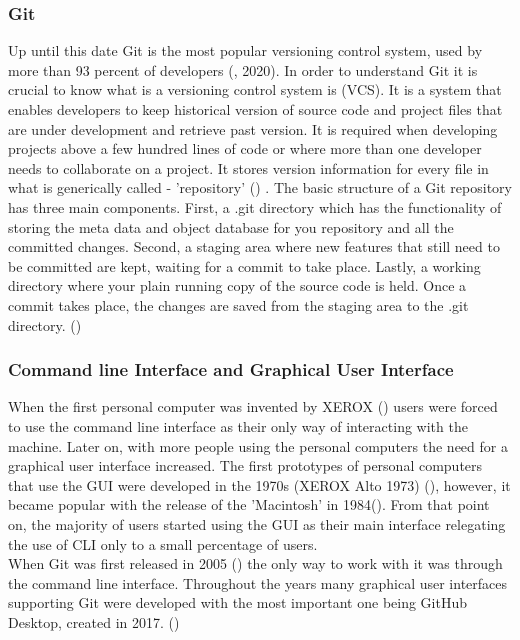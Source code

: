 \documentclass[]{report}
\begin{document}
	\subsubsection{Git}
	Up until this date Git is the most popular versioning control system, used by more than 93 percent of developers (\cite{stackoverflow_stack_nodate}, 2020). In order to understand Git it is crucial to know what is a versioning control system is (VCS). It is a system that enables developers to keep historical version of source code and project files that are under development and retrieve past version. It is required when developing projects above a few hundred lines of code or where more than one developer needs to collaborate on a project. It stores version information for every file in what is generically called - 'repository' (\cite{ruparelia_history_2010}) . The basic structure of a Git repository has three main components. First, a .git directory which has the functionality of storing the meta data and object database for you repository and all the committed changes. Second, a staging area where new features that still need to be committed are kept, waiting for a commit to take place. Lastly, a working directory where your plain running copy of the source code is held. Once a commit takes place, the changes are saved from the staging area to the .git directory. (\cite{hultstrand_git_2015})
	
	\subsubsection{Command line Interface and Graphical User Interface}
	
	When the first personal computer was invented by XEROX (\cite{smith_fumbling_1999}) users were forced to use the command line interface as their only way of interacting with the machine. Later on, with more people using the personal computers the need for a graphical user interface increased. The first prototypes of personal computers that use the GUI were developed in the 1970s (XEROX Alto 1973) (\cite{reimer_history_nodate}), however, it became popular with the release of the 'Macintosh' in 1984(\cite{reimer_history_nodate}). From that point on, the majority of users started using the GUI as their main interface relegating the use of CLI only to a small percentage of users.\\When Git was first released in 2005 (\cite{scott_chacon_and_ben_straub_git_nodate}) the only way to work with it was through the command line interface. Throughout the years many graphical user interfaces supporting Git were developed with the most important one being GitHub Desktop, created in 2017. (\cite{forster_announcing_2017})
	
\end{document}
